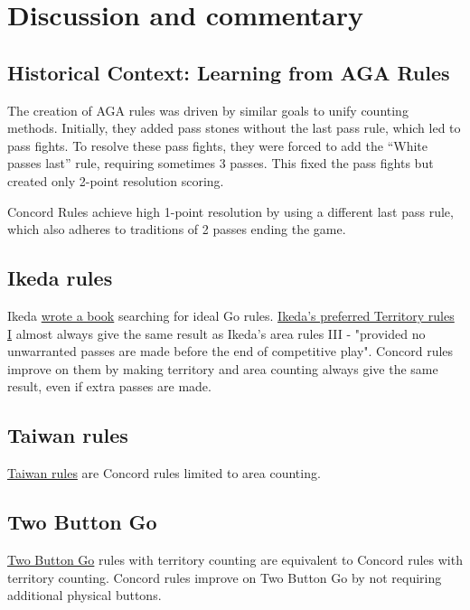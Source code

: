 \documentclass[11pt]{article}
\begin{document}
\newpage

\section*{Discussion and commentary}

\subsection*{Historical Context: Learning from AGA Rules}

The creation of AGA rules was driven by similar goals to unify counting methods.
Initially, they added pass stones without the last pass rule, which led to pass fights.
To resolve these pass fights, they were forced to add the ``White passes last'' rule, requiring sometimes 3 passes.
This fixed the pass fights but created only 2-point resolution scoring.

Concord Rules achieve high 1-point resolution by using a different last pass rule, which also adheres to traditions of 2 passes ending the game.

\subsection*{Ikeda rules}
Ikeda \href{https://gobase.org/studying/rules/ikeda/}{wrote a book} searching for ideal Go rules.
\href{https://gobase.org/studying/rules/ikeda/?sec=e_rules}{Ikeda's preferred Territory rules I} almost always give the same result as Ikeda's area rules III
- "provided no unwarranted passes are made before the end of competitive play".
Concord rules improve on them by making territory and area counting always give the same result, even if extra passes are made.

\subsection*{Taiwan rules}
\href{https://senseis.xmp.net/?TaiwanRules}{Taiwan rules} are Concord rules limited to area counting.

\subsection*{Two Button Go}
\href{https://senseis.xmp.net/?TwoButtonGo}{Two Button Go} rules with territory counting are equivalent to Concord rules with territory counting.
Concord rules improve on Two Button Go by not requiring additional physical buttons.
\end{document}
